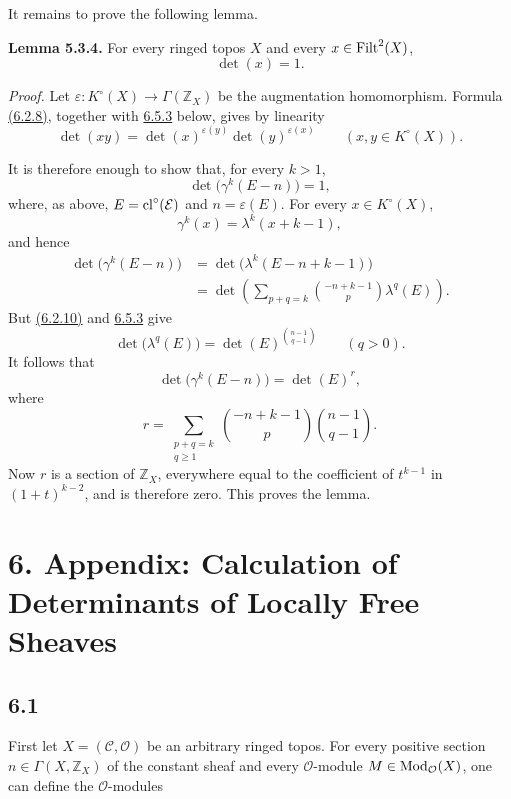 It remains to prove the following lemma.

\textbf{Lemma 5.3.4.}
For every ringed topos $X$ and every $x\in\operatorname{Filt}^2(X)$,
\[
\det(x)=1.
\]

\emph{Proof.}
Let $\varepsilon:K^\circ(X)\to\Gamma(\mathbb Z_X)$ be the augmentation
homomorphism. Formula \hyperlink{sga6.e10.eq.6-2-8}{(6.2.8)}, together with \hyperlink{sga6.e10.para.6-5-3}{6.5.3} below, gives by linearity
\begin{equation}\tag{5.3.5}
\det(xy)=\det(x)^{\varepsilon(y)}\det(y)^{\varepsilon(x)}
\qquad(x,y\in K^\circ(X)).
\end{equation}

It is therefore enough to show that, for every $k>1$,
\[
\det\bigl(\gamma^k(E-n)\bigr)=1,
\]
where, as above, $E=\operatorname{cl}^\circ(\mathcal E)$ and
$n=\varepsilon(E)$. For every $x\in K^\circ(X)$,
\[
\gamma^k(x)=\lambda^k(x+k-1),
\]
and hence
\[
\begin{aligned}
\det\bigl(\gamma^k(E-n)\bigr)
&=\det\bigl(\lambda^k(E-n+k-1)\bigr)\\
&=\det\left(
\sum_{p+q=k}\binom{-n+k-1}{p}\lambda^q(E)
\right).
\end{aligned}
\]
But \hyperlink{sga6.e10.eq.6-2-10}{(6.2.10)} and \hyperlink{sga6.e10.para.6-5-3}{6.5.3} give
\[
\det\bigl(\lambda^q(E)\bigr)
=\det(E)^{\binom{n-1}{q-1}}
\qquad(q>0).
\]
It follows that
\[
\det\bigl(\gamma^k(E-n)\bigr)=\det(E)^r,
\]
where
\[
r=\sum_{\substack{p+q=k\\q\geq1}}
\binom{-n+k-1}{p}\binom{n-1}{q-1}.
\]
Now $r$ is a section of $\mathbb Z_X$, everywhere equal to the coefficient of
$t^{k-1}$ in $(1+t)^{k-2}$, and is therefore zero. This proves the lemma.

\section*{6. Appendix: Calculation of Determinants of Locally Free Sheaves}

\subsection*{6.1}
First let $X=(\mathcal C,\mathcal O)$ be an arbitrary ringed topos. For every
positive section $n\in\Gamma(X,\mathbb Z_X)$ of the constant sheaf and every
$\mathcal O$-module $M\in\operatorname{Mod}_{\mathcal O}(X)$, one can define the
$\mathcal O$-modules

